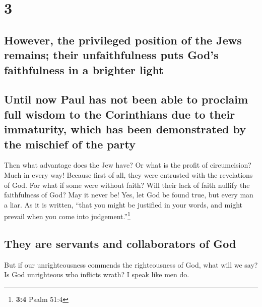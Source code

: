\hypertarget{section-2}{%
\section{3}\label{section-2}}

\hypertarget{however-the-privileged-position-of-the-jews-remains-their-unfaithfulness-puts-gods-faithfulness-in-a-brighter-light}{%
\subsection{However, the privileged position of the Jews remains; their
unfaithfulness puts God's faithfulness in a brighter
light}\label{however-the-privileged-position-of-the-jews-remains-their-unfaithfulness-puts-gods-faithfulness-in-a-brighter-light}}

\hypertarget{until-now-paul-has-not-been-able-to-proclaim-full-wisdom-to-the-corinthians-due-to-their-immaturity-which-has-been-demonstrated-by-the-mischief-of-the-party}{%
\subsection{Until now Paul has not been able to proclaim full wisdom to
the Corinthians due to their immaturity, which has been demonstrated by
the mischief of the
party}\label{until-now-paul-has-not-been-able-to-proclaim-full-wisdom-to-the-corinthians-due-to-their-immaturity-which-has-been-demonstrated-by-the-mischief-of-the-party}}

 Then what advantage does the Jew have? Or what is the
profit of circumcision?  Much in every way! Because first
of all, they were entrusted with the revelations of God. 
For what if some were without faith? Will their lack of faith nullify
the faithfulness of God?  May it never be! Yes, let God be
found true, but every man a liar. As it is written, ``that you might be
justified in your words, and might prevail when you come into
judgement.''\footnote{\textbf{3:4} Psalm 51:4}

\hypertarget{they-are-servants-and-collaborators-of-god}{%
\subsection{They are servants and collaborators of
God}\label{they-are-servants-and-collaborators-of-god}}

 But if our unrighteousness commends the righteousness of
God, what will we say? Is God unrighteous who inflicts wrath? I speak
like men do.

